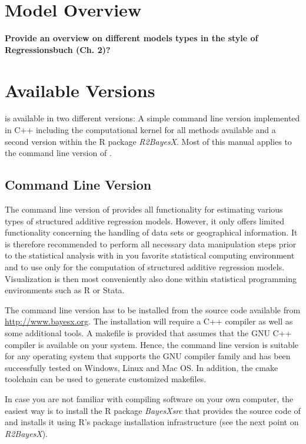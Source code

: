 \section{Model Overview}

{\color{red}\bfseries Provide an overview on different models types in the style of Regressionsbuch (Ch. 2)?}

\section{Available Versions}
 \label{availableversions}

\BayesX is available in two different versions: A simple command line version implemented in C++ including the computational kernel for all methods available and a second version within the R package {\it R2BayesX}. Most of this manual applies to the command line version of \BayesX. 

\subsection{Command Line Version}

The command line version of \BayesX provides all functionality for estimating various types of structured additive regression models. However, it only offers limited functionality concerning the handling of data sets or geographical information. It is therefore recommended to perform all necessary data manipulation steps prior to the statistical analysis with \BayesX in you favorite statistical computing environment and to use \BayesX only for the computation of structured additive regression models. Visualization is then most conveniently also done within statistical programming environments such as R or Stata.

The command line version has to be installed from the source code available from \href{http://www.bayesx.org}{http://www.bayesx.org}. The installation will require a C++ compiler as well as some additional tools. A makefile is provided that assumes that the GNU C++ compiler is available on your system. Hence, the command line version is suitable for any operating system that supports the GNU compiler family and has been successfully tested on Windows, Linux and Mac OS. In addition, the cmake toolchain can be used to generate customized makefiles.

In case you are not familiar with compiling software on your own computer, the easiest way is to install the R package {\it BayesXsrc} that provides the source code of \BayesX and installs it using R's package installation infrastructure (see the next point on {\it R2BayesX}).


